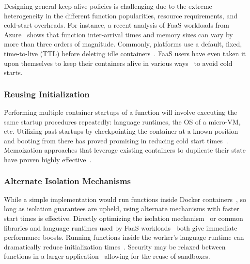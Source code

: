 Designing general keep-alive policies is challenging due to the extreme heterogeneity in the different function popularities, resource requirements, and cold-start overheads.
For instance, a recent analysis of FaaS workloads from Azure~\cite{shahrad_serverless_2020} shows that function inter-arrival times and memory sizes can vary by more than three orders of magnitude.
Commonly, platforms use a default, fixed, time-to-live (TTL) before deleting idle containers~\cite{openwhisk}.
FaaS users have even taken it upon themselves to keep their containers alive in various ways~\cite{warm2,warm1} to avoid cold starts.



\subsubsection{Reusing Initialization}
Performing multiple container startups of a function will involve executing the same startup procedures repeatedly: language runtimes, the OS of a micro-VM, etc.
Utilizing past startups by checkpointing the container at a known position and booting from there has proved promising in reducing cold start times~\cite{du2020catalyzer,vhive-asplos21}.
Memoization approaches that leverage existing containers to duplicate their state have proven highly effective~\cite{du2020catalyzer,wei2022booting}.

\subsubsection{Alternate Isolation Mechanisms}
While a simple implementation would run functions inside Docker containers~\cite{docker-main}, so long as isolation guarantees are upheld, using alternate mechanisms with faster start times is effective.
Directly optimizing the isolation mechanism~\cite{firecracker-nsdi20} or common libraries and language runtimes used by FaaS workloads~\cite{carreira2021warm} both give immediate performance boosts. 
Running functions inside the worker's language runtime can dramatically reduce initialization times~\cite{vhive-asplos21,shillaker2020faasm,jia2021nightcore,du2020catalyzer}.
Security may be relaxed between functions in a larger application~\cite{akkus_sand_2018, dukic2020photons} allowing for the reuse of sandboxes.
%

